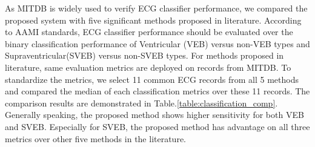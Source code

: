 \begin{table}[b]
\centering
\caption{Classification Performance and Within-Set Variation of Proposed System}
\label{table:variation}
\end{table}

As MITDB is widely used to verify ECG classifier performance, we compared the proposed system with five significant methods proposed in literature. According to AAMI standards, ECG classifier performance should be evaluated over the binary classification performance of Ventricular (VEB) versus non-VEB types and Supraventricular(SVEB) versus non-SVEB types. For methods proposed in literature, same evaluation metrics are deployed on records from MITDB. To standardize the metrics, we select 11 common ECG records from all 5 methods and compared the median of each classification metrics over these 11 records. The comparison results are demonstrated in Table.\ref{table:classification_comp}. Generally speaking, the proposed method shows higher sensitivity for both VEB and SVEB. Especially for SVEB, the proposed method has advantage on all three metrics over other five methods in the literature.



